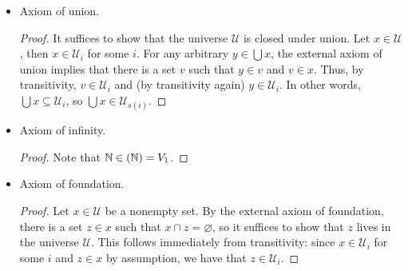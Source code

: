\documentclass[a4paper]{article}
\newcommand{\N}{\mathbb{N}}
\let\P\relax
\newcommand{\P}{\mathcal{P}}
\newcommand{\U}{\mathcal{U}}
\begin{document}
\begin{enumerate}
\begin{itemize}
\begin{proof}
      Let $x \in \U$.
      Then $x \in \U_{i}$ for some $i$, so $x \subseteq \U_{i}$ by Problem 1.
      Then it follows that $y \subseteq \U_{i}$ for each subset of $x$.
      In other words, each subset of $x$ lives in $\U_{s(i)}$.
      Thus, the set containing exactly these sets, i.e., $\P(x)$, is a subset of $\U_{s(i)}$, so the powerset lives in $\U_{s(s(i))}$.
    \end{proof}
  \item Axiom of union.
    \begin{proof}
      It suffices to show that the universe $\U$ is closed under union.
      Let $x \in \U$, then $x \in \U_{i}$ for some $i$.
      For any arbitrary $y \in \bigcup x$, the external axiom of union implies that there is a set $v$ such that $y \in v$ and $v \in x$.
      Thus, by transitivity, $v \in \U_{i}$ and (by transitivity again) $y \in \U_{i}$.
      In other words, $\bigcup x \subseteq \U_{i}$, so $\bigcup x \in \U_{s(i)}$.
    \end{proof}
  \item Axiom of infinity.
    \begin{proof}
      Note that $\N \in \P(\N) = V_{1}$.
    \end{proof}
  \item Axiom of foundation.
    \begin{proof}
      Let $x \in \U$ be a nonempty set.
      By the external axiom of foundation, there is a set $z \in x$ such that $x \cap z = \varnothing$, so it suffices to show that $z$ lives in the universe $\U$.
      This follows immediately from transitivity: since $x \in \U_{i}$ for some $i$ and $z \in x$ by assumption, we have that $z \in \U_{i}$.
    \end{proof}
  \end{itemize}
\end{enumerate}

\end{document}
